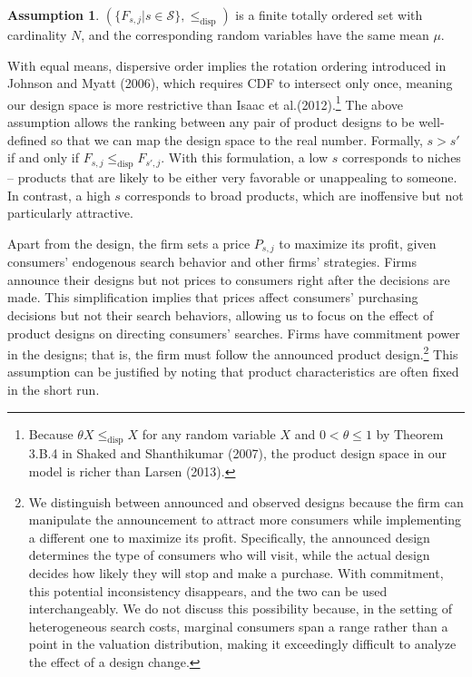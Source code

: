 \documentclass[14pt]{article}
\theoremstyle{plain}
\theoremstyle{definition}
\newtheorem{ass}{Assumption}
\theoremstyle{remark}
\DeclareRobustCommand\1{\futurelet\oneNext\oneCheck}
\renewcommand{\S}{\mathcal{S}}
\begin{document}
\begin{ass}\label{ass:disp}
$(\{F_{s,j}| s\in \mathcal{S} \}, \leq_{\text{disp}})$ is a finite totally ordered set with cardinality $N$, and the corresponding random variables have the same mean $\mu$.
\end{ass}

With equal means, dispersive order implies the rotation ordering introduced in Johnson and Myatt (2006), which requires CDF to intersect only once,  meaning our design space is more restrictive than Isaac et al.(2012).\footnote{Because $\theta X \leq_{\text{disp}} X$ for any random variable $X$ and $ 0<\theta \leq 1$ by Theorem 3.B.4 in Shaked and Shanthikumar (2007), the product design space in our model is richer than Larsen (2013).} The above assumption allows the ranking between any pair of product designs to be well-defined so that we can map the design space to the real number. Formally, $s>s'$ if and only if $F_{s,j}\leq_{\text{disp}}F_{s',j}$. With this formulation, a low $s$ corresponds to niches -- products that are likely to be either very favorable or unappealing to someone. In contrast, a high $s$ corresponds to broad products, which are inoffensive but not particularly attractive.
 
 
 
 Apart from the design, the firm sets a price $P_{s,j}$ to maximize its profit, given consumers' endogenous search behavior and other firms' strategies. Firms announce their designs but not prices to consumers right after the decisions are made. This simplification implies that prices affect consumers' purchasing decisions but not their search behaviors, allowing us to focus on the effect of product designs on directing consumers' searches. Firms have commitment power in the designs; that is, the firm must follow the announced product design.\footnote{ We distinguish between announced and observed designs because the firm can manipulate the announcement to attract more consumers while implementing a different one to maximize its profit. Specifically, the announced design determines the type of consumers who will visit, while the actual design decides how likely they will stop and make a purchase. With commitment, this potential inconsistency disappears, and the two can be used interchangeably. We do not discuss this possibility because, in the setting of heterogeneous search costs, marginal consumers span a range rather than a point in the valuation distribution, making it exceedingly difficult to analyze the effect of a design change.} This assumption can be justified by noting that product characteristics are often fixed in the short run. 
 
\end{document}
